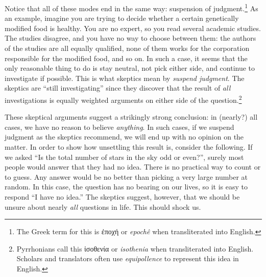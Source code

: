 Notice that all of these modes end in the same way: suspension of judgment.\footnote{The Greek term for this is \textgreek{ἐποχή} or \textit{epochê} when transliterated into English.} As an example, imagine you are trying to decide whether a certain genetically modified food is healthy. You are no expert, so you read several academic studies. The studies disagree, and you have no way to choose between them: the authors of the studies are all equally qualified, none of them works for the corporation responsible for the modified food, and so on. In such a case, it seems that the only reasonable thing to do is stay neutral, not pick either side, and continue to investigate if possible. This is what skeptics mean by \textit{suspend judgment}. The skeptics are ``still investigating'' since they discover that the result of \textit{all} investigations is equally weighted arguments on either side of the question.\footnote{Pyrrhonians call this \textgreek{ἰσοθενία} or \textit{isothenia} when transliterated into English. Scholars and translators often use \textit{equipollence} to represent this idea in English.}

These skeptical arguments suggest a strikingly strong conclusion: in (nearly?) all cases, we have no reason to believe \textit{anything}. In such cases, if we suspend judgment as the skeptics recommend, we will end up with no opinion on the matter. In order to show how unsettling this result is, consider the following. If we asked ``Is the total number of stars in the sky odd or even?'', surely most people would answer that they had no idea. There is no practical way to count or to guess. Any answer would be no better than picking a very large number at random. In this case, the question has no bearing on our lives, so it is easy to respond ``I have no idea.'' The skeptics suggest, however, that we should be unsure about nearly \textit{all} questions in life. This should shock us.

